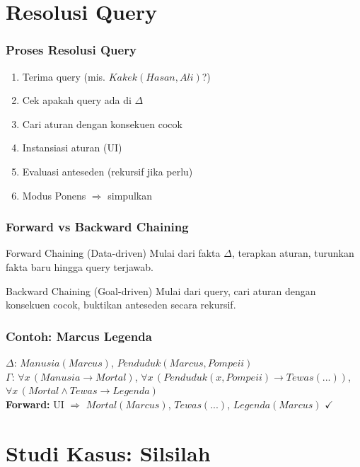 \documentclass[handout]{beamer}
\theoremstyle{definition}
\theoremstyle{example}
\begin{document}
\section{Resolusi Query}

\begin{frame}
\frametitle{Proses Resolusi Query}
\begin{enumerate}
  \item Terima query (mis. $Kakek(Hasan, Ali)$?)
  \item Cek apakah query ada di $\Delta$
  \item Cari aturan dengan konsekuen cocok
  \item Instansiasi aturan (UI)
  \item Evaluasi anteseden (rekursif jika perlu)
  \item Modus Ponens $\Rightarrow$ simpulkan
\end{enumerate}
\end{frame}

\begin{frame}
\frametitle{Forward vs Backward Chaining}
\begin{block}{Forward Chaining (Data-driven)}
Mulai dari fakta $\Delta$, terapkan aturan, turunkan fakta baru hingga query terjawab.
\end{block}
\begin{block}{Backward Chaining (Goal-driven)}
Mulai dari query, cari aturan dengan konsekuen cocok, buktikan anteseden secara rekursif.
\end{block}
\end{frame}

\begin{frame}
\frametitle{Contoh: Marcus Legenda}
$\Delta$: $Manusia(Marcus)$, $Penduduk(Marcus, Pompeii)$\\
$\Gamma$: $\forall x\,(Manusia \rightarrow Mortal)$, $\forall x\,(Penduduk(x,Pompeii) \rightarrow Tewas(...))$, $\forall x\,(Mortal \wedge Tewas \rightarrow Legenda)$\\
\textbf{Forward:} UI $\Rightarrow$ $Mortal(Marcus)$, $Tewas(...)$, $Legenda(Marcus)$ $\checkmark$
\end{frame}

\section{Studi Kasus: Silsilah}
\end{document}
